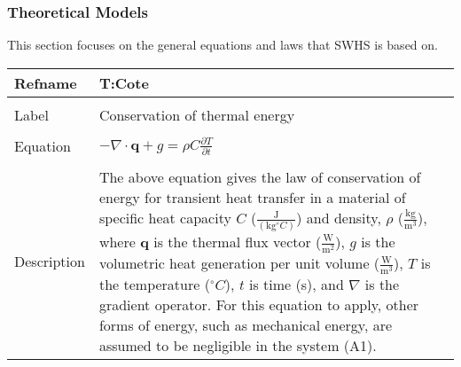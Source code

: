 \documentclass[12pt]{article}
\begin{document}
\subsubsection{Theoretical Models}
\label{Sec:TM}
This section focuses on the general equations and laws that SWHS is based on.
~\newline
\noindent \begin{minipage}{\textwidth}
\begin{tabular}{p{} p{}}
\toprule \textbf{Refname} & \textbf{T:Cote}
\label{T:Cote}
\\ \midrule \\
Label & Conservation of thermal energy
\\ \midrule \\
Equation & $-\nabla{}\cdot{}\mathbf{q}+g=\rho{}C\frac{\partial{}T}{\partial{}t}$
\\ \midrule \\
Description & The above equation gives the law of conservation of energy for transient heat transfer in a material of specific heat capacity $C$ ($\frac{\text{J}}{(\text{kg}{}^{\circ}C)}$) and density, $\rho{}$ ($\frac{\text{kg}}{\text{m}^{3}}$), where $\mathbf{q}$ is the thermal flux vector ($\frac{\text{W}}{\text{m}^{2}}$), $g$ is the volumetric heat generation per unit volume ($\frac{\text{W}}{\text{m}^{3}}$), $T$ is the temperature (${}^{\circ}C$), $t$ is time (s), and $\nabla{}$ is the gradient operator. For this equation to apply, other forms of energy, such as mechanical energy, are assumed to be negligible in the system (A1).
\\ \bottomrule \end{tabular}
\end{minipage}\\
~\newline
\end{document}
